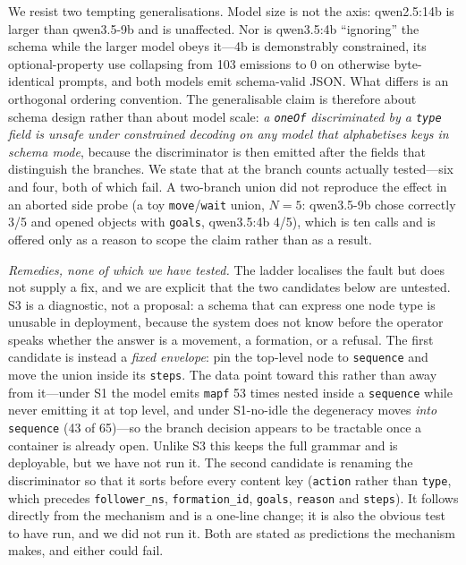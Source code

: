 \documentclass[10pt,twocolumn]{article}
\newcommand{\code}[1]{\texttt{\small #1}}
\begin{document}
We resist two tempting generalisations. Model size is not the axis:
qwen2.5:14b is larger than qwen3.5-9b and is unaffected. Nor is qwen3.5:4b
``ignoring'' the schema while the larger model obeys it---4b is demonstrably
constrained, its optional-property use collapsing from 103 emissions to 0 on
otherwise byte-identical prompts, and both models emit schema-valid JSON.
What differs is an orthogonal ordering convention. The generalisable claim is
therefore about schema design rather than about model scale: \emph{a
\code{oneOf} discriminated by a \code{type} field is unsafe under constrained
decoding on any model that alphabetises keys in schema mode}, because the
discriminator is then emitted after the fields that distinguish the branches.
We state that at the branch counts actually tested---six and four, both of
which fail. A two-branch union did not reproduce the effect in an aborted side
probe (a toy \code{move}/\code{wait} union, $N{=}5$: qwen3.5-9b chose correctly
3/5 and opened objects with \code{goals}, qwen3.5:4b 4/5), which is ten calls
and is offered only as a reason to scope the claim rather than as a result.

\emph{Remedies, none of which we have tested.} The ladder localises the fault
but does not supply a fix, and we are explicit that the two candidates below
are untested. S3 is a diagnostic, not a proposal: a schema that can express one
node type is unusable in deployment, because the system does not know before
the operator speaks whether the answer is a movement, a formation, or a
refusal. The first candidate is instead a \emph{fixed envelope}: pin the
top-level node to \code{sequence} and move the union inside its \code{steps}.
The data point toward this rather than away from it---under S1 the model emits
\code{mapf} 53 times nested inside a \code{sequence} while never emitting it at
top level, and under S1-no-idle the degeneracy moves \emph{into}
\code{sequence} (43 of 65)---so the branch decision appears to be tractable
once a container is already open. Unlike S3 this keeps the full grammar and is
deployable, but we have not run it. The second candidate is renaming the
discriminator so that it sorts before every content key (\code{action} rather
than \code{type}, which precedes \code{follower\_ns}, \code{formation\_id},
\code{goals}, \code{reason} and \code{steps}). It follows directly from the
mechanism and is a one-line change; it is also the obvious test to have run,
and we did not run it. Both are stated as predictions the mechanism makes, and
either could fail.
\end{document}
